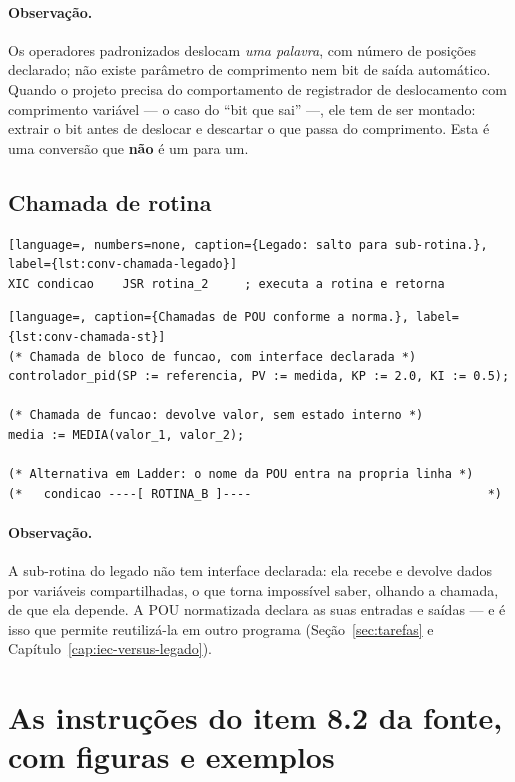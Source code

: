 \paragraph{Observação.} Os operadores padronizados deslocam \emph{uma palavra}, com número de posições
declarado; não existe parâmetro de comprimento nem bit de saída automático. Quando o projeto precisa
do comportamento de registrador de deslocamento com comprimento variável --- o caso do ``bit que sai''
---, ele tem de ser montado: extrair o bit antes de deslocar e descartar o que passa do comprimento.
Esta é uma conversão que \textbf{não} é um para um.

\subsection{Chamada de rotina}

\begin{lstlisting}[language=, numbers=none, caption={Legado: salto para sub-rotina.}, label={lst:conv-chamada-legado}]
XIC condicao    JSR rotina_2     ; executa a rotina e retorna
\end{lstlisting}

\begin{lstlisting}[language=, caption={Chamadas de POU conforme a norma.}, label={lst:conv-chamada-st}]
(* Chamada de bloco de funcao, com interface declarada *)
controlador_pid(SP := referencia, PV := medida, KP := 2.0, KI := 0.5);

(* Chamada de funcao: devolve valor, sem estado interno *)
media := MEDIA(valor_1, valor_2);

(* Alternativa em Ladder: o nome da POU entra na propria linha *)
(*   condicao ----[ ROTINA_B ]----                                 *)
\end{lstlisting}

\paragraph{Observação.} A sub-rotina do legado não tem interface declarada: ela recebe e devolve dados
por variáveis compartilhadas, o que torna impossível saber, olhando a chamada, de que ela depende. A POU
normatizada declara as suas entradas e saídas --- e é isso que permite reutilizá-la em outro programa
(Seção~\ref{sec:tarefas} e Capítulo~\ref{cap:iec-versus-legado}).

\section{As instruções do item 8.2 da fonte, com figuras e exemplos}
\label{sec:catalogo-82}

